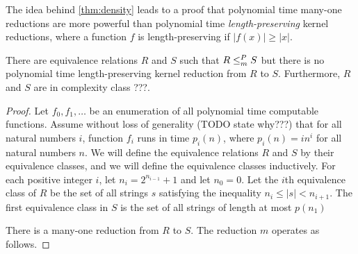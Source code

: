 The idea behind \autoref{thm:density} leads to a proof that polynomial time many-one reductions are more powerful than polynomial time \emph{length-preserving} kernel reductions, where a function $f$ is length-preserving if $|f(x)| \geq |x|$.

\begin{theorem}
  There are equivalence relations $R$ and $S$ such that $R \leq^{P}_{m} S$ but there is no polynomial time length-preserving kernel reduction from $R$ to $S$.
  Furthermore, $R$ and $S$ are in complexity class ???.
\end{theorem}
\begin{proof}
  Let $f_0, f_1, \dotsc$ be an enumeration of all polynomial time computable functions.
  Assume without loss of generality (TODO state why???) that for all natural numbers $i$, function $f_i$ runs in time $p_i(n)$, where $p_i(n) = i n^i$ for all natural numbers $n$.
  We will define the equivalence relations $R$ and $S$ by their equivalence classes, and we will define the equivalence classes inductively.
  For each positive integer $i$, let $n_i = 2^{n_{i - 1}} + 1$ and let $n_0 = 0$.
  Let the $i$th equivalence class of $R$ be the set of all strings $s$ satisfying the inequality $n_i \leq |s| < n_{i + 1}$.
  The first equivalence class in $S$ is the set of all strings of length at most $p(n_1)$

  There is a many-one reduction from $R$ to $S$.
  The reduction $m$ operates as follows.
\end{proof}
